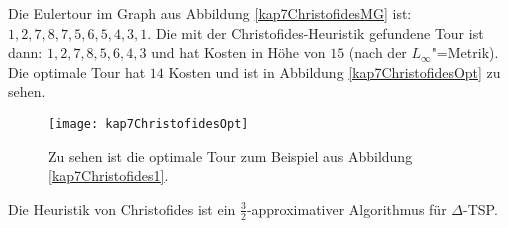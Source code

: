 Die Eulertour im Graph aus Abbildung \vref{kap7ChristofidesMG} ist: $1, 2, 7, 8, 7, 5, 6, 5, 4, 3, 1$. Die mit der Christofides-Heuristik gefundene Tour ist dann: $1, 2, 7, 8, 5, 6, 4, 3$ und hat Kosten in Höhe von $15$ (nach der $L_{\infty}$"=Metrik). Die optimale Tour hat $14$ Kosten und ist in Abbildung \vref{kap7ChristofidesOpt} zu sehen.

\begin{figure}[htb]
  \centering
  \texttt{[image: kap7ChristofidesOpt]}
  \caption{Zu sehen ist die optimale Tour zum Beispiel aus Abbildung \ref{kap7Christofides1}.}
  \label{kap7ChristofidesOpt}
\end{figure}

\begin{Satz}
  \hspace{\parindent}Die Heuristik von Christofides ist ein $\frac{3}{2}$-approximativer Algorithmus für $\varDelta$-TSP.
\end{Satz}

